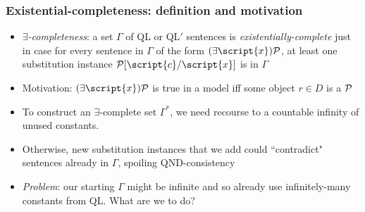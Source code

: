 \begin{frame}
\begin{itemize}[<+->]

\end{itemize}
\end{frame}

\begin{frame}
\frametitle{Existential-completeness: definition and motivation}

\begin{itemize}[<+->]

\item \emph{$\exists$-completeness}: a set $\Gamma$ of QL or QL$'$ sentences is \textit{existentially-complete} just in case for every sentence in $\Gamma$ of the form $\qt{\exists}{\script{x}} \metav{P}$, at least one substitution instance $\metav{P}[\script{c}/\script{x}]$ is in $\Gamma$ 

\bigskip 

\item Motivation: $\qt{\exists}{\script{x}} \metav{P}$ is true in a model iff some object $r \in D$ is a $\mathcal{P}$ 


\item To construct an $\exists$-complete set $\Gamma^{\ast}$, we need recourse to a countable infinity of unused constants. 

\item Otherwise, new substitution instances that we add could ``contradict" sentences already in $\Gamma$, spoiling QND-consistency 

\item \textit{Problem}: our starting $\Gamma$ might be infinite and so already use infinitely-many constants from QL. What are we to do? 



%
\end{itemize}
\end{frame}



